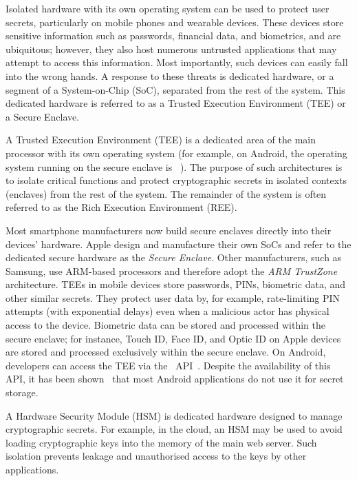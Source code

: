 Isolated hardware with its own operating system can be used to protect user secrets, particularly on mobile phones and wearable devices. These devices store sensitive information such as passwords, financial data, and biometrics, and are ubiquitous; however, they also host numerous untrusted applications that may attempt to access this information. Most importantly, such devices can easily fall into the wrong hands. A response to these threats is dedicated hardware, or a segment of a System-on-Chip (SoC), separated from the rest of the system. This dedicated hardware is referred to as a Trusted Execution Environment (TEE) or a Secure Enclave.

A Trusted Execution Environment (TEE) is a dedicated area of the main processor with its own operating system (for example, on Android, the operating system running on the secure enclave is ~\cite{android_trusty_tee}). The purpose of such architectures is to isolate critical functions and protect cryptographic secrets in isolated contexts (enclaves) from the rest of the system. The remainder of the system is often referred to as the Rich Execution Environment (REE).

Most smartphone manufacturers now build secure enclaves directly into their devices' hardware. Apple design and manufacture their own SoCs and refer to the dedicated secure hardware as the \textit{Secure Enclave}. Other manufacturers, such as Samsung, use ARM-based processors and therefore adopt the \textit{ARM TrustZone} architecture. TEEs in mobile devices store passwords, PINs, biometric data, and other similar secrets. They protect user data by, for example, rate-limiting PIN attempts (with exponential delays) even when a malicious actor has physical access to the device. Biometric data can be stored and processed within the secure enclave; for instance, Touch ID, Face ID, and Optic ID on Apple devices~\cite{apple_biometric_security} are stored and processed exclusively within the secure enclave. On Android, developers can access the TEE via the ~API~\cite{android_keystore_api}. Despite the availability of this API, it has been shown~\cite{blessing2025keydroidlargescaleanalysissecure} that most Android applications do not use it for secret storage.

A Hardware Security Module (HSM) is dedicated hardware designed to manage cryptographic secrets. For example, in the cloud, an HSM may be used to avoid loading cryptographic keys into the memory of the main web server. Such isolation prevents leakage and unauthorised access to the keys by other applications.
